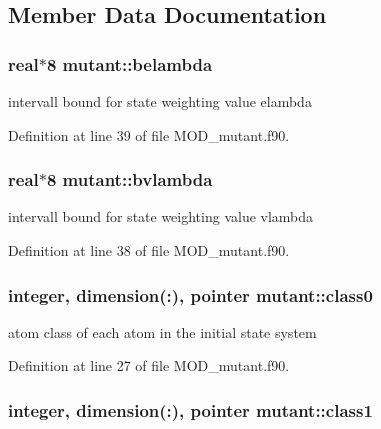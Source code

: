\subsection{Member Data Documentation}
\hypertarget{classmutant_a6e1ac466a4ab5d849a19af6216765580}{
\subsubsection[{belambda}]{\setlength{\rightskip}{0pt plus 5cm}real$\ast$8 mutant\-::belambda}}\label{classmutant_a6e1ac466a4ab5d849a19af6216765580}


intervall bound for state weighting value elambda 



Definition at line 39 of file M\-O\-D\-\_\-mutant.\-f90.

\hypertarget{classmutant_a2fc9516c774c42c250c40ea663059747}{
\subsubsection[{bvlambda}]{\setlength{\rightskip}{0pt plus 5cm}real$\ast$8 mutant\-::bvlambda}}\label{classmutant_a2fc9516c774c42c250c40ea663059747}


intervall bound for state weighting value vlambda 



Definition at line 38 of file M\-O\-D\-\_\-mutant.\-f90.

\hypertarget{classmutant_a1d5964a9c3f4e954ed53b36f8fc119cd}{
\subsubsection[{class0}]{\setlength{\rightskip}{0pt plus 5cm}integer, dimension(\-:), pointer mutant\-::class0}}\label{classmutant_a1d5964a9c3f4e954ed53b36f8fc119cd}


atom class of each atom in the initial state system 



Definition at line 27 of file M\-O\-D\-\_\-mutant.\-f90.

\hypertarget{classmutant_ac7c18bbd9d33ced2a6f0aee1097b927f}{
\subsubsection[{class1}]{\setlength{\rightskip}{0pt plus 5cm}integer, dimension(\-:), pointer mutant\-::class1}}\label{classmutant_ac7c18bbd9d33ced2a6f0aee1097b927f}



